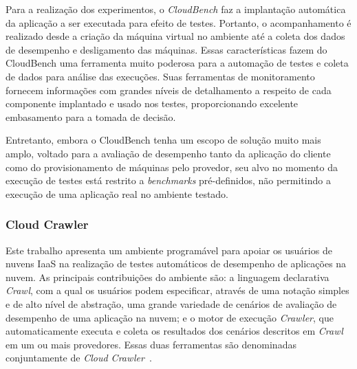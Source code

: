 Para a realização dos experimentos, o \textit{CloudBench} faz a implantação automática da aplicação a ser executada para efeito de testes. Portanto, o acompanhamento é realizado desde a criação da máquina virtual no ambiente até a coleta dos dados de desempenho e desligamento das máquinas. Essas características fazem do CloudBench uma ferramenta muito poderosa para a
automação de testes e coleta de dados para análise das execuções. Suas ferramentas
de monitoramento fornecem informações com grandes níveis de detalhamento a respeito
de cada componente implantado e usado nos testes, proporcionando excelente embasamento
para a tomada de decisão.

Entretanto, embora o CloudBench tenha um escopo de solução muito mais amplo, 
voltado para a avaliação de desempenho tanto da aplicação do cliente como do 
provisionamento de máquinas pelo provedor, seu alvo no momento da execução de 
testes está restrito a \textit{benchmarks} pré-definidos, não permitindo a execução de 
uma aplicação real no ambiente testado.


\subsubsection{Cloud Crawler}
Este trabalho apresenta um ambiente programável para apoiar os usuários de nuvens IaaS na realização de testes automáticos de desempenho de aplicações na nuvem. As principais contribuições do ambiente são: a linguagem declarativa {\em Crawl}, com a qual os usuários podem especificar, através de uma notação simples e de alto nível de abstração, uma grande variedade de cenários de avaliação de desempenho de uma aplicação na nuvem; e o motor de execução {\em Crawler}, que automaticamente executa e coleta os resultados dos cenários descritos em {\em Crawl} em um ou mais provedores. Essas duas ferramentas são denominadas conjuntamente de {\em Cloud Crawler}~\cite{cunhacloud}.

